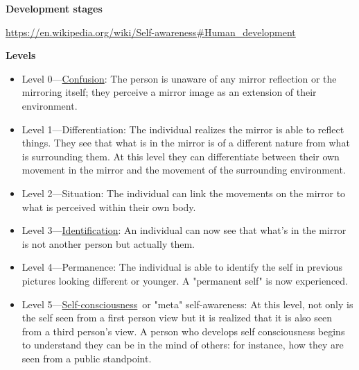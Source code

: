 \documentclass{book}
\providecommand{\ProjectDeepHeading}[2]{%
    \par\medskip\noindent\textbf{#2}\par\smallskip
}
\begin{document}
\ProjectDeepHeading{4}{Development stages}


\url{https://en.wikipedia.org/wiki/Self-awareness\#Human_development}
    \ProjectDeepHeading{7}{Levels}
        \begin{itemize}
            \item Level 0—\href{https://en.wikipedia.org/wiki/Confusion}{Confusion}: The person is unaware of any mirror reflection or the mirroring itself; they perceive a mirror image as an extension of their environment.
        \end{itemize}
        \begin{itemize}
            \item Level 1—Differentiation: The individual realizes the mirror is able to reflect things. They see that what is in the mirror is of a different nature from what is surrounding them. At this level they can differentiate between their own movement in the mirror and the movement of the surrounding environment.
        \end{itemize}
        \begin{itemize}
            \item Level 2—Situation: The individual can link the movements on the mirror to what is perceived within their own body.
        \end{itemize}
        \begin{itemize}
            \item Level 3—\href{https://en.wikipedia.org/wiki/Identification_(psychology)}{Identification}: An individual can now see that what's in the mirror is not another person but actually them.
        \end{itemize}
        \begin{itemize}
            \item Level 4—Permanence: The individual is able to identify the self in previous pictures looking different or younger. A "permanent self" is now experienced.
        \end{itemize}
        \begin{itemize}
            \item Level 5—\href{https://en.wikipedia.org/wiki/Self-consciousness}{Self-consciousness} or "meta" self-awareness: At this level, not only is the self seen from a first person view but it is realized that it is also seen from a third person's view. A person who develops self consciousness begins to understand they can be in the mind of others: for instance, how they are seen from a public standpoint.
        \end{itemize}
\end{document}
